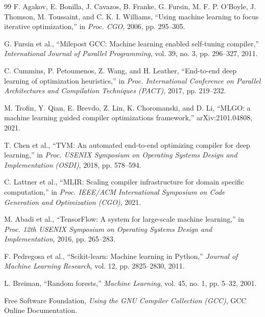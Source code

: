 \begin{thebibliography}{99}
F. Agakov, E. Bonilla, J. Cavazos, B. Franke, G. Fursin, M. F. P. O'Boyle,
J. Thomson, M. Toussaint, and C. K. I. Williams,
``Using machine learning to focus iterative optimization,''
in \textit{Proc. CGO}, 2006, pp. 295--305.

G. Fursin et al.,
``Milepost GCC: Machine learning enabled self-tuning compiler,''
\textit{International Journal of Parallel Programming}, vol. 39, no. 3,
pp. 296--327, 2011.

C. Cummins, P. Petoumenos, Z. Wang, and H. Leather,
``End-to-end deep learning of optimization heuristics,''
in \textit{Proc. International Conference on Parallel Architectures and
Compilation Techniques (PACT)}, 2017, pp. 219--232.

M. Trofin, Y. Qian, E. Brevdo, Z. Lin, K. Choromanski, and D. Li,
``MLGO: a machine learning guided compiler optimizations framework,''
arXiv:2101.04808, 2021.

T. Chen et al.,
``TVM: An automated end-to-end optimizing compiler for deep learning,''
in \textit{Proc. USENIX Symposium on Operating Systems Design and
Implementation (OSDI)}, 2018, pp. 578--594.

C. Lattner et al.,
``MLIR: Scaling compiler infrastructure for domain specific computation,''
in \textit{Proc. IEEE/ACM International Symposium on Code Generation and
Optimization (CGO)}, 2021.

M. Abadi et al.,
``TensorFlow: A system for large-scale machine learning,''
in \textit{Proc. 12th USENIX Symposium on Operating Systems Design and
Implementation}, 2016, pp. 265--283.

F. Pedregosa et al.,
``Scikit-learn: Machine learning in Python,''
\textit{Journal of Machine Learning Research}, vol. 12, pp. 2825--2830, 2011.

L. Breiman,
``Random forests,''
\textit{Machine Learning}, vol. 45, no. 1, pp. 5--32, 2001.

Free Software Foundation,
\textit{Using the GNU Compiler Collection (GCC)},
GCC Online Documentation.

\end{thebibliography}

